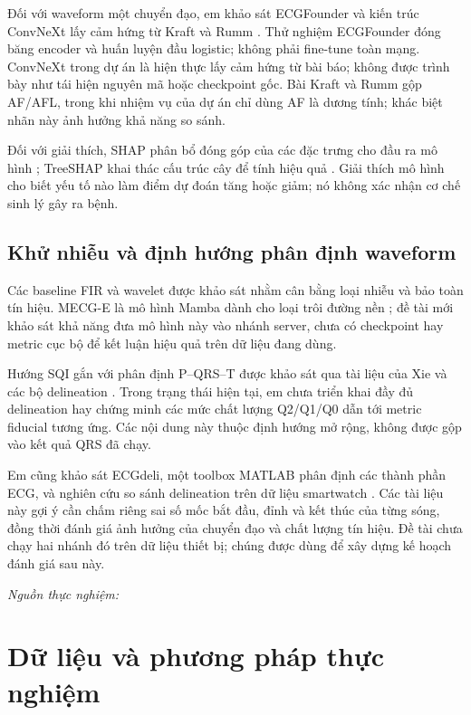 \documentclass[12pt,a4paper,oneside]{report}
\newcommand{\artifact}[1]{\par\noindent\textit{Nguồn thực nghiệm:}\ \path{#1}\par}
\begin{document}
Đối với waveform một chuyển đạo, em khảo sát ECGFounder và kiến trúc ConvNeXt lấy cảm hứng từ Kraft và Rumm \cite{ecgfounder2025,kraft2025}. Thử nghiệm ECGFounder đóng băng encoder và huấn luyện đầu logistic; không phải fine-tune toàn mạng. ConvNeXt trong dự án là hiện thực lấy cảm hứng từ bài báo; không được trình bày như tái hiện nguyên mã hoặc checkpoint gốc. Bài Kraft và Rumm gộp AF/AFL, trong khi nhiệm vụ của dự án chỉ dùng AF là dương tính; khác biệt nhãn này ảnh hưởng khả năng so sánh.

Đối với giải thích, SHAP phân bổ đóng góp của các đặc trưng cho đầu ra mô hình \cite{shap2017}; TreeSHAP khai thác cấu trúc cây để tính hiệu quả \cite{treeshap2020}. Giải thích mô hình cho biết yếu tố nào làm điểm dự đoán tăng hoặc giảm; nó không xác nhận cơ chế sinh lý gây ra bệnh.

\section{Khử nhiễu và định hướng phân định waveform}
Các baseline FIR và wavelet được khảo sát nhằm cân bằng loại nhiễu và bảo toàn tín hiệu. MECG-E là mô hình Mamba dành cho loại trôi đường nền \cite{mecge2024}; đề tài mới khảo sát khả năng đưa mô hình này vào nhánh server, chưa có checkpoint hay metric cục bộ để kết luận hiệu quả trên dữ liệu đang dùng.

Hướng SQI gắn với phân định P--QRS--T được khảo sát qua tài liệu của Xie và các bộ delineation \cite{xie2021,martinez2004}. Trong trạng thái hiện tại, em chưa triển khai đầy đủ delineation hay chứng minh các mức chất lượng Q2/Q1/Q0 dẫn tới metric fiducial tương ứng. Các nội dung này thuộc định hướng mở rộng, không được gộp vào kết quả QRS đã chạy.

Em cũng khảo sát ECGdeli, một toolbox MATLAB phân định các thành phần ECG, và nghiên cứu so sánh delineation trên dữ liệu smartwatch \cite{ecgdeli2021,jaeger2024}. Các tài liệu này gợi ý cần chấm riêng sai số mốc bắt đầu, đỉnh và kết thúc của từng sóng, đồng thời đánh giá ảnh hưởng của chuyển đạo và chất lượng tín hiệu. Đề tài chưa chạy hai nhánh đó trên dữ liệu thiết bị; chúng được dùng để xây dựng kế hoạch đánh giá sau này.
\artifact{docs/SQA_BASED_ECG_DELINEATION_PIPELINE.md}

\chapter{Dữ liệu và phương pháp thực nghiệm}
\end{document}
